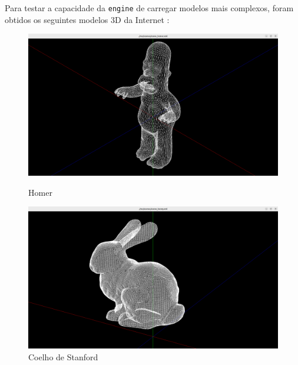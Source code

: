 \documentclass[12pt, a4paper]{article}
\begin{document}
Para testar a capacidade da \texttt{engine} de carregar modelos mais complexos, foram obtidos os
seguintes modelos 3D da Internet \cite{models}:

\begin{figure}[H]
    \centering
    \begin{minipage}{0.48\textwidth}
        \centering
        \includegraphics[width=\textwidth]{res/phase1/results/Homer.png}
        \caption{Homer}
    \end{minipage}\hfill
    \begin{minipage}{0.48\textwidth}
        \centering
        \includegraphics[width=\textwidth]{res/phase1/results/Bunny.png}
        \caption{Coelho de Stanford}
    \end{minipage}
\end{figure}
\end{document}
